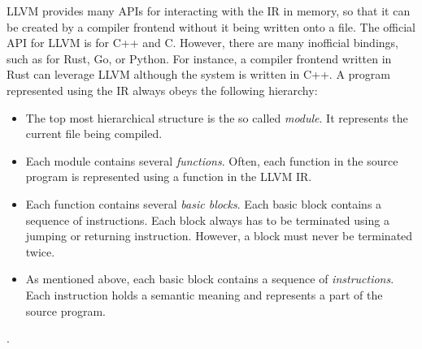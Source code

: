 LLVM provides many APIs for interacting with the IR in memory, so that it can be created by a compiler frontend without it being written onto a file.
The official API for LLVM is for C++ and C.
However, there are many inofficial bindings, such as for Rust, Go, or Python.
For instance, a compiler frontend written in Rust can leverage LLVM although the system is written in C++.
A program represented using the IR always obeys the following hierarchy:

\begin{itemize}
	\item The top most hierarchical structure is the so called \emph{module}.
	      It represents the current file being compiled.
	\item Each module contains several \emph{functions}.
	      Often, each function in the source program is represented using a function in the LLVM IR.
	\item Each function contains several \emph{basic blocks}.
	      Each basic block contains a sequence of instructions.
	      Each block always has to be terminated using a jumping or returning instruction.
	      However, a block must never be terminated twice.
	\item As mentioned above, each basic block contains a sequence of \emph{instructions}.
	      Each instruction holds a semantic meaning and represents a part of the source program.
\end{itemize} \cite[p.~211-213]{Hsu2021-ez}.




